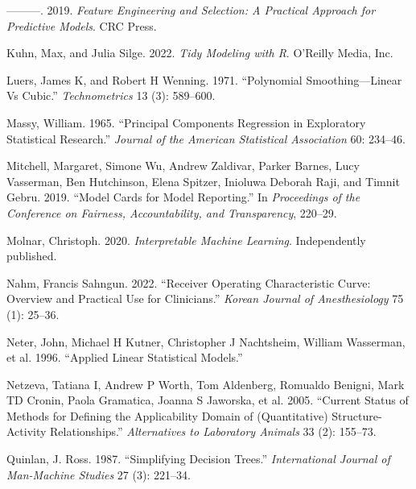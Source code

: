 \documentclass[
  letterpaper,
  DIV=11,
  numbers=noendperiod]{scrartcl}
\newlength{\cslhangindent}
\newlength{\cslentryspacingunit} %
\newenvironment{CSLReferences}[2] %
 {%
  \setlength{\parindent}{0pt}
  \ifodd #1
  \let\oldpar\par
  \def\par{\hangindent=\cslhangindent\oldpar}
  \fi
  \setlength{\parskip}{#2\cslentryspacingunit}
 }%
 {}
\begin{document}
\begin{CSLReferences}{1}{0}
\leavevmode{}%
---------. 2019. \emph{Feature Engineering and Selection: A Practical
Approach for Predictive Models}. CRC Press.

\leavevmode{}%
Kuhn, Max, and Julia Silge. 2022. \emph{Tidy Modeling with {R}}.
O'Reilly Media, Inc.

\leavevmode{}%
Luers, James K, and Robert H Wenning. 1971. {``Polynomial
Smoothing---Linear Vs Cubic.''} \emph{Technometrics} 13 (3): 589--600.

\leavevmode{}%
Massy, William. 1965. {``Principal Components Regression in Exploratory
Statistical Research.''} \emph{Journal of the American Statistical
Association} 60: 234--46.

\leavevmode{}%
Mitchell, Margaret, Simone Wu, Andrew Zaldivar, Parker Barnes, Lucy
Vasserman, Ben Hutchinson, Elena Spitzer, Inioluwa Deborah Raji, and
Timnit Gebru. 2019. {``Model Cards for Model Reporting.''} In
\emph{Proceedings of the Conference on Fairness, Accountability, and
Transparency}, 220--29.

\leavevmode{}%
Molnar, Christoph. 2020. \emph{Interpretable Machine Learning}.
Independently published.

\leavevmode{}%
Nahm, Francis Sahngun. 2022. {``Receiver Operating Characteristic Curve:
Overview and Practical Use for Clinicians.''} \emph{Korean Journal of
Anesthesiology} 75 (1): 25--36.

\leavevmode{}%
Neter, John, Michael H Kutner, Christopher J Nachtsheim, William
Wasserman, et al. 1996. {``Applied Linear Statistical Models.''}

\leavevmode{}%
Netzeva, Tatiana I, Andrew P Worth, Tom Aldenberg, Romualdo Benigni,
Mark TD Cronin, Paola Gramatica, Joanna S Jaworska, et al. 2005.
{``Current Status of Methods for Defining the Applicability Domain of
(Quantitative) Structure-Activity Relationships.''} \emph{Alternatives
to Laboratory Animals} 33 (2): 155--73.

\leavevmode{}%
Quinlan, J. Ross. 1987. {``Simplifying Decision Trees.''}
\emph{International Journal of Man-Machine Studies} 27 (3): 221--34.


\end{CSLReferences}
\end{document}
